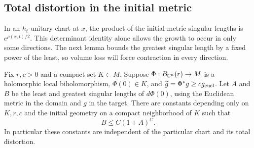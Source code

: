 \subsection{Total distortion in the initial metric}

In an $h_t$-unitary chart at $x$, the product of the initial-metric
singular lengths is $e^{\rho(x,t)/2}$.  This determinant identity alone
allows the growth to occur in only some directions.  The next lemma
bounds the greatest singular length by a fixed power of the least,
so volume loss will force contraction in every direction.

\begin{lemma}\label{lem:static-distortion}
Fix $r,c>0$ and a compact set $K\subset M$.  Suppose
$\Phi:B_{\mathbb C^n}(r)\to M$ is a holomorphic local biholomorphism,
$\Phi(0)\in K$, and $\widetilde g=\Phi^*g\ge c g_{\rm eucl}$.
Let $A$ and $B$ be the least and greatest singular lengths of
$d\Phi(0)$, using the Euclidean metric in the domain and $g$ in
the target.  There are constants depending only on $K,r,c$ and
the initial geometry on a compact neighborhood of $K$ such that
\begin{equation}\label{chart:static-distortion}
 B\le C(1+A)^C.
\end{equation}
In particular these constants are independent of the particular
chart and its total distortion.
\end{lemma}

